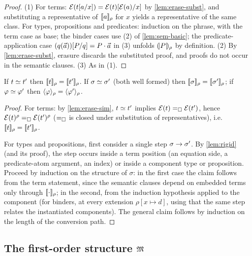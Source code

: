\begin{proof}
(1) For terms: $\mathcal{E}(t[a/x]) =
\mathcal{E}(t)[\mathcal{E}(a)/x]$ by \cref{lem:erase-subst}, and
substituting a representative of $[\![ a ]\!]_\rho$ for $x$ yields a
representative of the same class.  For types, propositions and
predicates: induction on the phrase, with the term case as base; the
binder cases use (2) of \cref{lem:sem-basic}; the predicate-application
case $(q(\vec{a}))[P/q] = P \cdot \vec{a}$ in (3) unfolds
$(\!| P |\!)_{\rho}$ by definition.  (2) By \cref{lem:erase-subst}, erasure
discards the substituted proof, and proofs do not occur in the semantic
clauses.  (3) As in (1).
\end{proof}

\begin{lemma}
\label{lem:conv-inv}
If $t \simeq t'$ then $[\![ t ]\!]_\rho = [\![ t' ]\!]_\rho$.  If $\sigma \simeq
\sigma'$ (both well formed) then $[\![ \sigma ]\!]_{\rho} =
[\![ \sigma' ]\!]_{\rho}$; if $\varphi \simeq \varphi'$ then
$\langle \varphi \rangle_{\rho} = \langle \varphi' \rangle_{\rho}$.
\end{lemma}

\begin{proof}
For terms: by \cref{lem:erase-sim}, $t \simeq t'$ implies $\mathcal{E}(t)
=_{\square} \mathcal{E}(t')$, hence $\mathcal{E}(t)^\rho =_{\square} \mathcal{E}(t')^\rho$
($=_{\square}$ is closed under substitution of representatives), i.e.\
$[\![ t ]\!]_\rho = [\![ t' ]\!]_\rho$.

For types and propositions, first consider a single step $\sigma \rightarrow
\sigma'$.  By \cref{lem:rigid} (and its proof), the step occurs inside a
term position (an equation side, a predicate-atom argument, an index) or
inside a component type or proposition.  Proceed by induction on the
structure of $\sigma$: in the first case the claim follows from the term
statement, since the semantic clauses depend on embedded terms only
through $[\![ \cdot ]\!]_\rho$; in the second, from the induction hypothesis
applied to the component (for binders, at every extension $\rho[x
\mapsto d]$, using that the same step relates the instantiated
components).  The general claim follows by induction on the length of the
conversion path.
\end{proof}

\subsection{The first-order structure \texorpdfstring{$\mathfrak{M}$}{M}}
\label{sec:semantics-model}

